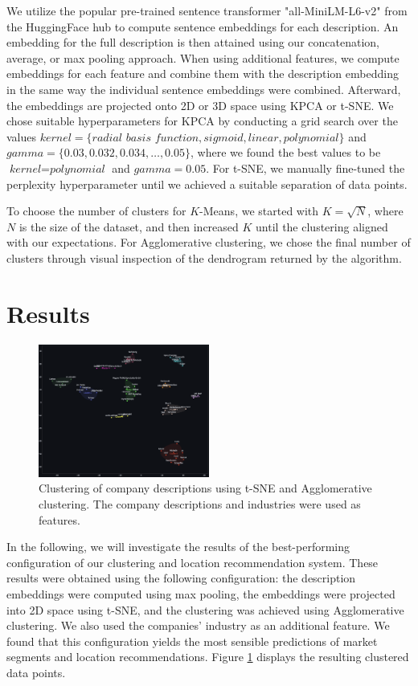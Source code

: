 \documentclass[conference]{IEEEtran}
\newcommand{\pe}[1]{\todo[inline, backgroundcolor=green]{PE: #1}}
\begin{document}
We utilize the popular pre-trained sentence transformer "all-MiniLM-L6-v2" from the HuggingFace hub to compute sentence embeddings for each description. An embedding for the full description is then attained using our concatenation, average, or max pooling approach. When using additional features, we compute embeddings for each feature and combine them with the description embedding in the same way the individual sentence embeddings were combined. \pe{Links and references plz}
Afterward, the embeddings are projected onto 2D or 3D space using KPCA or t-SNE. We chose suitable hyperparameters for KPCA by conducting a grid search over the values $\textit{kernel} = \{\textit{radial basis function}, \textit{sigmoid}, \textit{linear}, \textit{polynomial} \}$ and $\textit{gamma} = \{0.03, 0.032, 0.034, \dots, 0.05\}$, where we found the best values to be $\textit{kernel} = \textit{polynomial}$ and $\textit{gamma} = 0.05$. For t-SNE, we manually fine-tuned the perplexity hyperparameter until we achieved a suitable separation of data points.

To choose the number of clusters for $K$-Means, we started with $K = \sqrt{N}$, where $N$ is the size of the dataset, and then increased $K$ until the clustering aligned with our expectations. For Agglomerative clustering, we chose the final number of clusters through visual inspection of the dendrogram returned by the algorithm.


\section{Results}
\begin{figure}[H]
    \centering
    \includegraphics[width=0.5\textwidth]{figures/clustering_results.png}
    \caption{Clustering of company descriptions using t-SNE and Agglomerative clustering. The company descriptions and industries were used as features.}
    \label{fig:t-sne-agglomerative}
\end{figure}

In the following, we will investigate the results of the best-performing configuration of our clustering and location recommendation system. These results were obtained using the following configuration: the description embeddings were computed using max pooling, the embeddings were projected into 2D space using t-SNE, and the clustering was achieved using Agglomerative clustering. We also used the companies' industry as an additional feature.
 We found that this configuration yields the most sensible predictions of market segments and location recommendations. Figure \ref{fig:t-sne-agglomerative} displays the resulting clustered data points.
\end{document}
